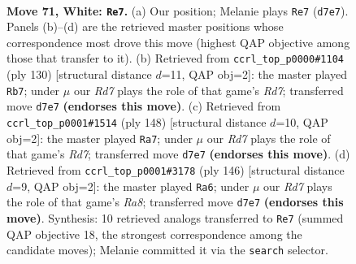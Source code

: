 \documentclass[11pt]{article}
\begin{document}
\clearpage

\begin{figure}[p]\centering
\begin{subfigure}{0.46\textwidth}\centering
\resizebox{\linewidth}{!}{%
\newchessgame
\chessboard[
  setfen={5rk1/P2R4/8/8/8/7K/8/8 w - - 11 71},
  showmover=false,
  pgfstyle=straightmove, color=movearrow, markmove={d7-e7}
]}
\caption{}
\end{subfigure}\hfill
\begin{subfigure}{0.46\textwidth}\centering
\resizebox{\linewidth}{!}{%
\newchessgame
\chessboard[
  setfen={5rk1/3R4/1p4K1/6P1/8/8/8/8 w - - 1 66},
  showmover=false,
  pgfstyle=straightmove, color=movearrow, markmove={d7-b7}
]}
\caption{}
\end{subfigure}
\\[4pt]
\begin{subfigure}{0.46\textwidth}\centering
\resizebox{\linewidth}{!}{%
\newchessgame
\chessboard[
  setfen={8/3R4/8/6pP/4kr2/8/8/3K4 w - - 16 75},
  showmover=false,
  pgfstyle=straightmove, color=movearrow, markmove={d7-a7}
]}
\caption{}
\end{subfigure}\hfill
\begin{subfigure}{0.46\textwidth}\centering
\resizebox{\linewidth}{!}{%
\newchessgame
\chessboard[
  setfen={R7/4rk2/8/5PK1/8/5P2/8/8 w - - 17 74},
  showmover=false,
  pgfstyle=straightmove, color=movearrow, markmove={a8-a6}
]}
\caption{}
\end{subfigure}
\caption{\textbf{Move 71, White: \texttt{Re7}.} (a) Our position; Melanie plays \texttt{Re7} (\texttt{d7e7}). Panels (b)--(d) are the retrieved master positions whose correspondence most drove this move (highest QAP objective among those that transfer to it). (b) Retrieved from \texttt{ccrl\_top\_p0000\#1104} (ply 130) [structural distance $d$=11, QAP obj=2]: the master played \texttt{Rb7}; under $\mu$ our \emph{Rd7} plays the role of that game's \emph{Rd7}; transferred move \texttt{d7e7} \textbf{(endorses this move)}. (c) Retrieved from \texttt{ccrl\_top\_p0001\#1514} (ply 148) [structural distance $d$=10, QAP obj=2]: the master played \texttt{Ra7}; under $\mu$ our \emph{Rd7} plays the role of that game's \emph{Rd7}; transferred move \texttt{d7e7} \textbf{(endorses this move)}. (d) Retrieved from \texttt{ccrl\_top\_p0001\#3178} (ply 146) [structural distance $d$=9, QAP obj=2]: the master played \texttt{Ra6}; under $\mu$ our \emph{Rd7} plays the role of that game's \emph{Ra8}; transferred move \texttt{d7e7} \textbf{(endorses this move)}. Synthesis: 10 retrieved analogs transferred to \texttt{Re7} (summed QAP objective 18, the strongest correspondence among the candidate moves); Melanie committed it via the \texttt{search} selector.}
\label{fig:thought-m140}
\end{figure}
\end{document}
